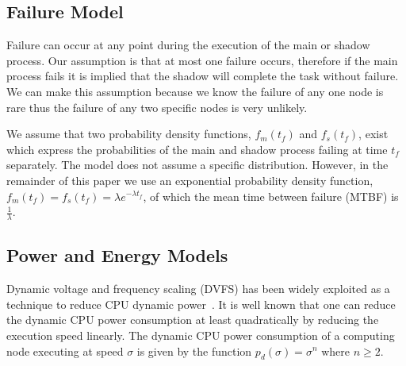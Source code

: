 \subsection{Failure Model}
Failure can occur at any point during the execution of the main or
shadow process. Our assumption is that at most one failure occurs,
therefore if the main process fails it is implied that the shadow will
complete the task without failure. We can make this assumption because
we know the failure of any one node is rare thus the failure
of any two specific nodes is very unlikely.


We assume that two probability density functions, $f_m(t_f)$ and
$f_s(t_f)$, exist which express the probabilities of the main and shadow
process failing at time $t_f$ separately. The model does not assume a
specific distribution. However, in the remainder of this paper we use
an exponential probability density function, $f_m(t_f)=f_s(t_f)=\lambda
e^{-\lambda t_f}$, of which the mean time between failure (MTBF) is $\frac{1}{\lambda}$.

\subsection{Power and Energy Models}
Dynamic voltage and frequency scaling
(DVFS) has
been widely exploited as a technique to reduce CPU dynamic power~\cite{flautner_2002_APS,pillai_2001_sosp}. It
is well known that one can reduce the dynamic CPU power consumption at
least quadratically by reducing the execution speed linearly. The
dynamic CPU power consumption of a computing node executing at speed
$\sigma$ is given by the function $p_d(\sigma)=\sigma^n$ where $n \ge
2$.

